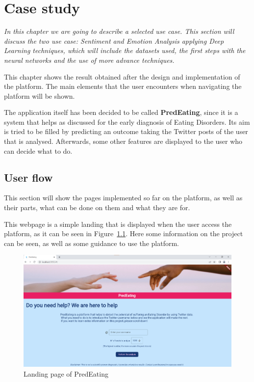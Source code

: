 \chapter{Case study}

\label{chap:case-study}

\textit{In this chapter we are going to describe a selected use case. This section will discuss the two use case: Sentiment and Emotion Analysis applying Deep Learning techniques, which will include the datasets used, the first steps with the neural networks and the use of more advance techniques.}

\clearpage

This chapter shows the result obtained after the design and implementation of the platform. The main elements that the user encounters when navigating the platform will be shown. 

The application itself has been decided to be called \textbf{PredEating}, since it is a system that helps as discussed for the early diagnosis of Eating Disorders. Its aim is tried to be filled by predicting an outcome taking the Twitter posts of the user that is analysed. Afterwards, some other features are displayed to the user who can decide what to do.

\section{User flow}

This section will show the pages implemented so far on the platform, as well as their parts, what can be done on them and what they are for.

This webpage is a simple landing that is displayed when the user access the platform, as it can be seen in Figure~\ref{fig:landing}. Here some information on the project can be seen, as well as some guidance to use the platform.


\begin{figure}[!htp]
    \centering
    \includegraphics[scale=0.5]{img/case/landing.png}
    \caption{Landing page of PredEating}
    \label{fig:landing}
\end{figure}

